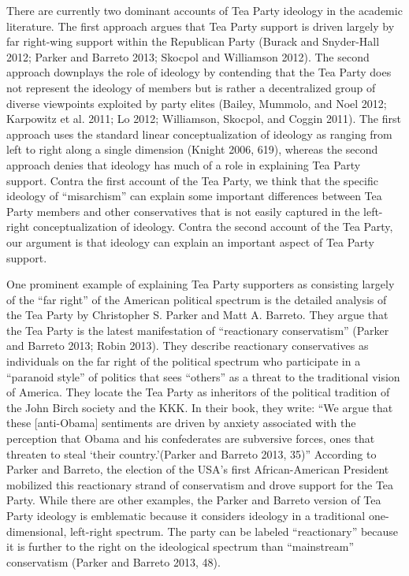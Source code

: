 \documentclass[12pt,]{article}
\begin{document}
There are currently two dominant accounts of Tea Party ideology in the
academic literature. The first approach argues that Tea Party support is
driven largely by far right-wing support within the Republican Party
(Burack and Snyder-Hall 2012; Parker and Barreto 2013; Skocpol and
Williamson 2012). The second approach downplays the role of ideology by
contending that the Tea Party does not represent the ideology of members
but is rather a decentralized group of diverse viewpoints exploited by
party elites (Bailey, Mummolo, and Noel 2012; Karpowitz et al. 2011; Lo
2012; Williamson, Skocpol, and Coggin 2011). The first approach uses the
standard linear conceptualization of ideology as ranging from left to
right along a single dimension (Knight 2006, 619), whereas the second
approach denies that ideology has much of a role in explaining Tea Party
support. Contra the first account of the Tea Party, we think that the
specific ideology of ``misarchism'' can explain some important
differences between Tea Party members and other conservatives that is
not easily captured in the left-right conceptualization of ideology.
Contra the second account of the Tea Party, our argument is that
ideology can explain an important aspect of Tea Party support.

One prominent example of explaining Tea Party supporters as consisting
largely of the ``far right'' of the American political spectrum is the
detailed analysis of the Tea Party by Christopher S. Parker and Matt A.
Barreto. They argue that the Tea Party is the latest manifestation of
``reactionary conservatism'' (Parker and Barreto 2013; Robin 2013). They
describe reactionary conservatives as individuals on the far right of
the political spectrum who participate in a ``paranoid style'' of
politics that sees ``others'' as a threat to the traditional vision of
America. They locate the Tea Party as inheritors of the political
tradition of the John Birch society and the KKK. In their book, they
write: ``We argue that these {[}anti-Obama{]} sentiments are driven by
anxiety associated with the perception that Obama and his confederates
are subversive forces, ones that threaten to steal `their
country.'(Parker and Barreto 2013, 35)'' According to Parker and
Barreto, the election of the USA's first African-American President
mobilized this reactionary strand of conservatism and drove support for
the Tea Party. While there are other examples, the Parker and Barreto
version of Tea Party ideology is emblematic because it considers
ideology in a traditional one-dimensional, left-right spectrum. The
party can be labeled ``reactionary'' because it is further to the right
on the ideological spectrum than ``mainstream'' conservatism (Parker and
Barreto 2013, 48).
\end{document}
